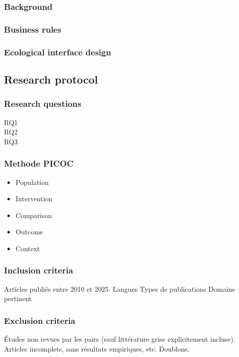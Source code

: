 \documentclass[a4paper,12pt]{article}
\begin{document}
\subsubsection{Background}
\label{sec:orge68d995}
\subsubsection{Business rules}
\label{sec:org9d019ce}

\subsubsection{Ecological interface design}
\label{sec:org61080a2}
\subsection{Research protocol}
\label{sec:org37d442a}
\subsubsection{Research questions}
\label{sec:orgff5f280}
\begin{description}
\item[{RQ1}] 

\item[{RQ2}] 

\item[{RQ3}] 
\end{description}
\subsubsection{Methode PICOC}
\label{sec:org02bcb9c}
\begin{itemize}
\item Population
\item Intervention
\item Comparison
\item Outcome
\item Context
\end{itemize}
\subsubsection{Inclusion criteria}
\label{sec:orgb2d15c8}
Articles publiés entre 2010 et 2025.
Langues
Types de publications
Domaine pertinent
\subsubsection{Exclusion criteria}
\label{sec:orgc208415}
Études non revues par les pairs (sauf littérature grise explicitement incluse).
Articles incomplets, sans résultats empiriques, etc.
Doublons.
\end{document}
